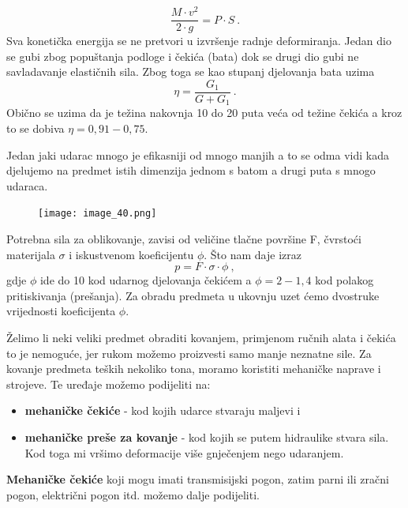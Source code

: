 \documentclass[a4paper,12pt]{article}
\numberwithin{figure}{section}
\begin{document}
\begin{equation}
\frac{M\cdot v^{2}}{2 \cdot g} = P\cdot S\:.
\end{equation}
Sva konetička energija se ne pretvori u izvršenje radnje deformiranja. Jedan dio se gubi zbog popuštanja podloge i čekića (bata) dok se drugi dio gubi ne savladavanje elastičnih sila. Zbog toga se kao  stupanj djelovanja bata uzima 
\begin{equation}
\eta = \frac{G_1}{G + G_{1}}\:.
\end{equation}
Obično se uzima da je težina nakovnja 10 do 20 puta veća od težine čekića a kroz to se dobiva $\eta = 0,91-0,75$.\par 
Jedan jaki udarac mnogo je efikasniji od mnogo manjih a to se odma vidi kada djelujemo na predmet istih dimenzija jednom s batom a drugi puta s mnogo udaraca.
\begin{figure}[!h]
\centering
\texttt{[image: image\_40.png]}
\end{figure}
\FloatBarrier
Potrebna sila za oblikovanje, zavisi od veličine tlačne površine F, čvrstoći materijala $\sigma$ i iskustvenom koeficijentu $\phi$. Što nam daje izraz
\begin{equation}
p = F\cdot \sigma \cdot \phi \:,
\end{equation}
gdje $\phi$ ide do 10 kod udarnog djelovanja čekićem a $\phi = 2 - 1,4$ kod polakog pritiskivanja (prešanja). Za obradu predmeta u ukovnju uzet ćemo dvostruke vrijednosti koeficijenta $\phi$.\par 
Želimo li neki veliki predmet obraditi kovanjem, primjenom ručnih alata i čekića to je nemoguće, jer rukom možemo proizvesti samo manje neznatne sile. Za kovanje predmeta teških nekoliko tona, moramo koristiti mehaničke naprave i strojeve. Te uređaje možemo podijeliti na:
\begin{itemize}
\item \textbf{mehaničke čekiće} - kod kojih udarce stvaraju maljevi i
\item \textbf{mehaničke preše za kovanje} - kod kojih se putem hidraulike stvara sila. Kod toga mi vršimo deformacije više gnječenjem nego udaranjem.
\end{itemize}
\par
\textbf{Mehaničke čekiće} koji mogu imati transmisijski pogon, zatim parni ili zračni pogon, električni pogon itd. možemo dalje podijeliti.
\end{document}
